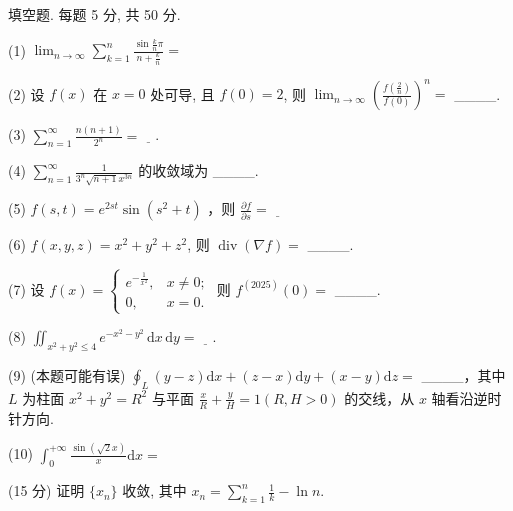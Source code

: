 填空题. 每题 5 分, 共 50 分.\par
(1) $\lim_{n\to \infty}\sum_{k = 1}^{n}\frac{\sin\frac{k}{n}\pi}{n + \frac{k}{n}} =$\par
(2) 设 $f(x)$ 在 $x = 0$ 处可导, 且 $f(0) = 2$, 则 $\lim_{n \to \infty} \left( \frac{f\left(\frac{2}{n}\right)}{f(0)} \right)^n =$ \_\_\_\_.\par
(3) $\sum_{n=1}^{\infty} \frac{n(n+1)}{2^n} = \underline{\quad}$.\par
(4) $\sum_{n=1}^{\infty} \frac{1}{3^n \sqrt{n+1} x^{3n}}$ 的收敛域为 \_\_\_\_.\par
(5) $f(s,t) = e^{2st}\sin (s^2 +t)$ ，则 $\frac{\partial f}{\partial s} = \underline{\quad}$\par
(6) $f(x,y,z) = x^{2} + y^{2} + z^{2}$, 则 $\operatorname{div}(\nabla f) =$ \_\_\_\_.\par
(7) 设  $f(x)=\left\{\begin{aligned}e^{-\frac{1}{x^{2}}}, & x\neq0;\\ 0, & x=0.\end{aligned}\right.$  则  $f^{(2025)}(0)=$  \_\_\_\_.\par
(8) $\iint_{x^2 + y^2 \leq 4} e^{-x^2 - y^2} \, \mathrm{d}x \, \mathrm{d}y = \underline{\quad}$.\par
(9) (本题可能有误) $\oint_{L} (y - z) \mathrm{d}x + (z - x) \mathrm{d}y + (x - y) \mathrm{d}z =$ \_\_\_\_，其中 $L$ 为柱面 $x^{2} + y^{2} = R^{2}$ 与平面 $\frac{x}{R} + \frac{y}{H} = 1 (R, H > 0)$ 的交线，从 $x$ 轴看沿逆时针方向.\par
(10) $\int_{0}^{+\infty}\frac{\sin(\sqrt{2}x)}{x}\mathrm{d}x =$\par
(15 分) 证明 $\{x_{n}\}$ 收敛, 其中 $x_{n} = \sum_{k=1}^{n} \frac{1}{k} - \ln n$.\par
